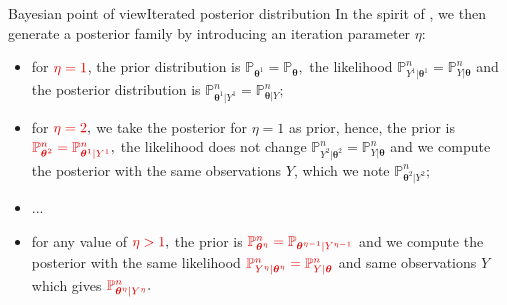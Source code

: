 \documentclass[10pt]{beamer}
\begin{document}
\begin{frame}{Bayesian point of view}{Iterated posterior distribution}
In the spirit of \textbf{\citet{OBJJ}}, we then generate a posterior family by introducing an \textcolor{red!90!black}{iteration parameter $\eta$}:
\begin{itemize}
\setlength\itemsep{1em}
\item<1-> for $\textcolor{red!90!black}{\eta = 1}$, the prior distribution is $\mathbb{P}_{\boldsymbol{\theta}^{1}} = \mathbb{P}_{\boldsymbol{\theta}},$ the likelihood $\mathbb{P}_{Y^{1} \vert \boldsymbol{\theta}^{1}}^{n} = \mathbb{P}_{Y \vert \boldsymbol{\theta}}^{n}$ and the posterior distribution is $\mathbb{P}_{\boldsymbol{\theta}^{1} \vert Y^{1}}^{n} = \mathbb{P}_{\boldsymbol{\theta}\vert Y}^{n};$
\item<2-> for $\textcolor{red!90!black}{\eta = 2},$ we take the posterior for $\eta = 1$ as prior, hence, the \textcolor{red!90!black}{prior is} $\textcolor{red!90!black}{\mathbb{P}_{\boldsymbol{\theta}^{2}}^{n} = \mathbb{P}_{\boldsymbol{\theta}^{1} \vert Y^{1}}^{n}},$ the likelihood does not change $\mathbb{P}_{Y^{2} \vert \boldsymbol{\theta}^{2}}^{n} = \mathbb{P}_{Y \vert \boldsymbol{\theta}}^{n}$ and we compute the posterior with the same observations $Y$, which we note $\mathbb{P}_{\boldsymbol{\theta}^{2} \vert Y^{2}}^{n};$
\item<3-> ...
\item<4-> for any value of $\textcolor{red!90!black}{\eta > 1},$ the prior is $\textcolor{red!90!black}{\mathbb{P}_{\boldsymbol{\theta}^{\eta}}^{n} = \mathbb{P}_{\boldsymbol{\theta}^{\eta-1} \vert Y^{\eta - 1}}}$ and we compute the posterior with the same likelihood $\textcolor{red!90!black}{\mathbb{P}_{Y^{\eta} \vert \boldsymbol{\theta}^{\eta}}^{n} = \mathbb{P}_{Y \vert \boldsymbol{\theta}}^{n}}$ and same observations $Y$ which gives $\textcolor{red!90!black}{\mathbb{P}_{\boldsymbol{\theta}^{\eta} \vert Y^{\eta}}^{n}}.$
\end{itemize}
\end{frame}
\end{document}
